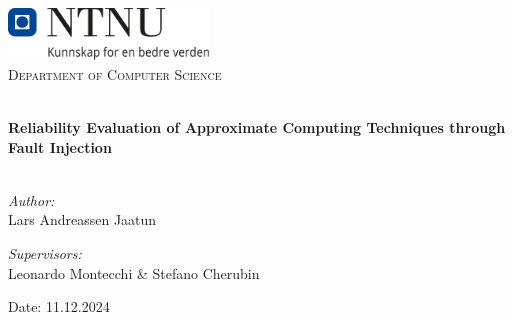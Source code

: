 
\begin{titlepage}
\vbox{ }
\vbox{ }
\begin{center}
\includegraphics[width=0.40\textwidth]{Images/NTNU_logo.png}\\[1cm]
\textsc{\LARGE Department of Computer Science}\\[1.5cm]
\vbox{ }

\HRule \\[0.4cm]
{ \huge \bfseries Reliability Evaluation of Approximate Computing Techniques through Fault Injection }\\[0.4cm]
\HRule \\[1.5cm]

\emph{\large Author:}\\
{\large Lars Andreassen Jaatun}

\emph{\large Supervisors:}\\
{\large Leonardo Montecchi \& Stefano Cherubin}
\vfill

{\large Date: 11.12.2024}
\end{center}
\end{titlepage}